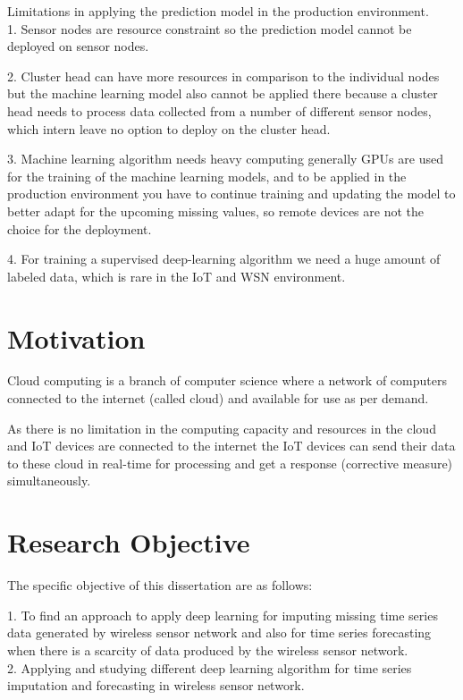 Limitations in applying the prediction model in the production environment.
\\

1. Sensor nodes are resource constraint so the prediction model cannot be deployed on sensor nodes.

2. Cluster head can have more resources in comparison to the individual nodes but the machine learning model also cannot be applied there because a cluster head needs to process data collected from a number of different sensor nodes, which intern leave no option to deploy on the cluster head.

3. Machine learning algorithm needs heavy computing generally GPUs are used for the training of the machine learning models, and to be applied in the production environment you have to continue training and updating the model to better adapt for the upcoming missing values, so remote devices are not the choice for the deployment.

4. For training a supervised deep-learning algorithm we need a huge amount of labeled data, which is rare in the IoT and WSN environment.


\section{Motivation}

Cloud computing is a branch of computer science where a network of computers connected to the internet (called cloud) and available for use as per demand.


As there is no limitation in the computing capacity and resources in the cloud and IoT devices are connected to the internet the IoT devices can send their data to these cloud in real-time for processing and get a response (corrective measure) simultaneously.


\section{Research Objective}
The specific objective of this dissertation are as follows:

1. To find an approach to apply deep learning for imputing missing time series data generated by wireless sensor network and also for time series forecasting when there is a scarcity of data produced by the wireless sensor network. \\

2. Applying and studying different deep learning algorithm for time series imputation and forecasting in wireless sensor network. \\

